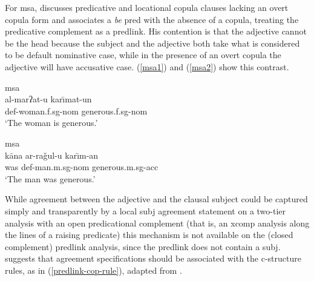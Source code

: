 \documentclass[output=paper,hidelinks]{langscibook}
\begin{document}







For {\sc msa}, \citet{attia08} discusses predicative and locational copula clauses lacking an overt copula form and associates a {\em be} {\sc pred} with the absence of a copula, treating the predicative complement as a {\sc predlink}.
His contention is that the adjective cannot be the head because the subject and the adjective both take what is considered to be default nominative case, while in the presence of an overt copula the adjective will have accusative case. (\ref{msa1}) and (\ref{msa2}) show this contrast.





\ea\label{msa1} {\sc msa} \citep[94]{attia08}\\
\gll al-mar{ʔ}at-u  kar\={\i}mat-un\\
{\sc def}-woman.{\sc f.sg-nom} generous.{\sc f.sg-nom}\\
\glt `The woman is generous.'
\z

\ea \label{msa2} {\sc msa}  \citep[100]{attia08}\\
\gll k\={a}na ar-ra\v{g}ul-u kar\={\i}m-an\\
was {\sc def}-man.{\sc m.sg-nom} generous.{\sc m.sg}-{\sc acc}\\
\glt `The man was generous.'
\z




While  agreement between the adjective and the clausal subject could be captured simply and transparently by a local {\sc subj} agreement statement on a two-tier analysis with an open predicational complement (that is, an  {\sc xcomp} analysis along the lines of a raising predicate) this mechanism is not available on the (closed complement)  {\sc predlink} analysis, since the {\sc predlink} does not contain a {\sc subj}.  \citet{attia08} suggests that agreement specifications should be associated with the c-structure rules, as in (\ref{predlink-cop-rule}), adapted from \citet[104]{attia08}.
\end{document}
